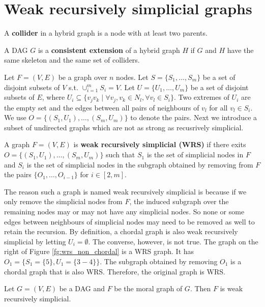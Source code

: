 \section{Weak recursively simplicial graphs}
\begin{definition}
\label{def:collider}
A \textbf{collider} in a hybrid graph is a node with at least two parents. 
\end{definition}

\begin{definition}
\label{def:consistent_ext}
A DAG $G$ is a \textbf{consistent extension} of a hybrid graph $H$ if $G$ and $H$ have the same skeleton and the same set of colliders. 
\end{definition}

Let $F=(V,E)$ be a graph over $n$ nodes. Let $S=\{S_1, \dots, S_m\}$ be a set of disjoint subsets of $V$ s.t. $\cup_{i=1}^m S_i=V$. Let $U=\{U_1, \dots, U_m\}$ be a set of disjoint subsets of $E$, where $U_i \subseteq \{v_jv_k \mid \forall v_j, v_k \in N_l, \forall v_l \in S_i\}$. Two extremes of $U_i$ are the empty set and the edges between all pairs of neighbours of $v_l$ for all $v_l \in S_i$. We use $O = \{(S_1, U_1), \dots, (S_m, U_m)\}$ to denote the pairs. Next we introduce a subset of undirected graphs which are not as strong as recusrively simplicial.  

\begin{definition}
\label{def:wrs}
A graph $F=(V,E)$ is \textbf{weak recursively simplicial (WRS)} if there exits $O = \{(S_1, U_1), \dots, (S_m, U_m)\}$ such that $S_1$ is the set of simplicial nodes in $F$ and $S_{i}$ is the set of simplicial nodes in the subgraph obtained by removing from $F$ the pairs $\{O_1, \dots, O_{i-1}\}$ for $i \in [2,m]$. 
\end{definition}
The reason such a graph is named weak recursively simplicial is because if we only remove the simplicial nodes from $F$, the induced subgraph over the remaining nodes may or may not have any simplicial nodes. So none or some edges between neighbours of simplicial nodes may need to be removed as well to retain the recursion. By definition, a chordal graph is also weak recursively simplicial by letting $U_i=\emptyset$. The converse, however, is not true. The graph on the right of Figure \ref{fg:wrs_non_chordal} is a WRS graph. It has $O_1 = \{S_1=\{5\}, U_1=\{3-4\}\}$. The subgraph obtained by removing $O_1$ is a chordal graph that is also WRS. Therefore, the original graph is WRS.  

\begin{theorem}
\label{prop:moral_implies_wrs}
Let $G=(V,E)$ be a DAG and $F$ be the moral graph of $G$. Then $F$ is weak recursively simplicial. 
\end{theorem}

